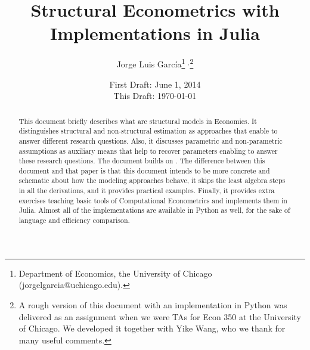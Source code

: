 




\title{\textbf{Structural Econometrics with Implementations in Julia}}
\author{Jorge Luis Garc\'{i}a\thanks{Department of Economics, the University of Chicago (jorgelgarcia@uchicago.edu).} $^{,}$\thanks{A rough version of this document with an implementation in Python was delivered as an assignment when we were TAs for Econ 350 at the University of Chicago. We developed it together with Yike Wang, who we thank for many useful comments.}}
\date{First Draft: June 1, 2014 \\ This Draft: \today}
\maketitle

\begin{abstract}
\noindent This document briefly describes what are structural models in Economics. It distinguishes structural and non-structural estimation as approaches that enable to answer different research questions. Also, it discusses parametric and non-parametric assumptions as auxiliary means that help to recover parameters enabling to answer these research questions. The document builds on \citet{keane2011structural}. The difference between this document and that paper is that this document intends to be more concrete and schematic about how the modeling approaches behave, it skips the least algebra steps in all the derivations, and it provides practical examples. Finally, it provides extra exercises teaching basic tools of Computational Econometrics and implements them in Julia. Almost all of the implementations are available in Python as well, for the sake of language and efficiency comparison.
\end{abstract}





\clearpage


\clearpage

